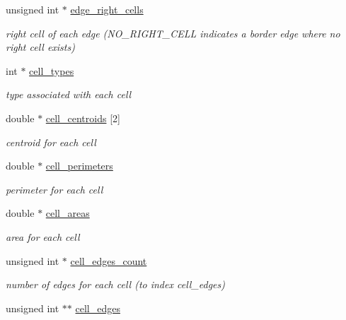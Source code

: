 \begin{DoxyCompactItemize}
unsigned int $\ast$ \hyperlink{structFVL_1_1CFVMesh2D__cuda_a0afdfdb2e2d98e52ee797d883dafcf2f}{edge\_\-right\_\-cells}
\begin{DoxyCompactList}\small\item\em right cell of each edge (NO\_\-RIGHT\_\-CELL indicates a border edge where no right cell exists) \item\end{DoxyCompactList}\item 
int $\ast$ \hyperlink{structFVL_1_1CFVMesh2D__cuda_a294a0484d68f983a11a627a5df0a767a}{cell\_\-types}
\begin{DoxyCompactList}\small\item\em type associated with each cell \item\end{DoxyCompactList}\item 
double $\ast$ \hyperlink{structFVL_1_1CFVMesh2D__cuda_a05beb562a8dc14ea92dd8cc7b36f5131}{cell\_\-centroids} \mbox{[}2\mbox{]}
\begin{DoxyCompactList}\small\item\em centroid for each cell \item\end{DoxyCompactList}\item 
double $\ast$ \hyperlink{structFVL_1_1CFVMesh2D__cuda_a05366b974186ac70d633948b29c56384}{cell\_\-perimeters}
\begin{DoxyCompactList}\small\item\em perimeter for each cell \item\end{DoxyCompactList}\item 
double $\ast$ \hyperlink{structFVL_1_1CFVMesh2D__cuda_ae8676892fd56ea5c4828b46ed48c222d}{cell\_\-areas}
\begin{DoxyCompactList}\small\item\em area for each cell \item\end{DoxyCompactList}\item 
unsigned int $\ast$ \hyperlink{structFVL_1_1CFVMesh2D__cuda_a0272dc8071de98dff11b0109af7bdbed}{cell\_\-edges\_\-count}
\begin{DoxyCompactList}\small\item\em number of edges for each cell (to index cell\_\-edges) \item\end{DoxyCompactList}\item 
unsigned int $\ast$$\ast$ \hyperlink{structFVL_1_1CFVMesh2D__cuda_a618dbcd16053ddd3695a69d156f9caea}{cell\_\-edges}
$$
\end{DoxyCompactItemize}
